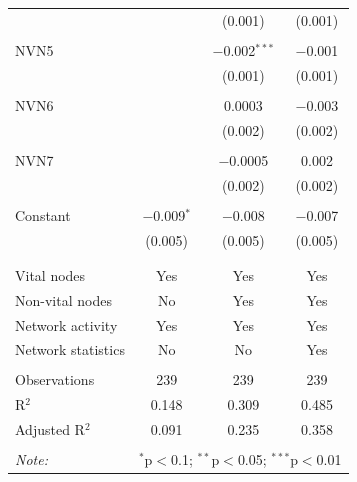 \begin{table}[!htbp]
\begin{tabular}{@{\extracolsep{5pt}}lccc}
  &  & (0.001) & (0.001) \\ 
  & & & \\ 
 NVN5 &  & $-$0.002$^{***}$ & $-$0.001 \\ 
  &  & (0.001) & (0.001) \\ 
  & & & \\ 
 NVN6 &  & 0.0003 & $-$0.003 \\ 
  &  & (0.002) & (0.002) \\ 
  & & & \\ 
 NVN7 &  & $-$0.0005 & 0.002 \\ 
  &  & (0.002) & (0.002) \\ 
  & & & \\ 
 Constant & $-$0.009$^{*}$ & $-$0.008 & $-$0.007 \\ 
  & (0.005) & (0.005) & (0.005) \\ 
  & & & \\ 
\hline \\[-1.8ex] 
Vital nodes & Yes & Yes & Yes \\ 
Non-vital nodes & No & Yes & Yes \\ 
Network activity & Yes & Yes & Yes \\ 
Network statistics & No & No & Yes \\ 
\hline &  &  &  \\ 
Observations & 239 & 239 & 239 \\ 
R$^{2}$ & 0.148 & 0.309 & 0.485 \\ 
Adjusted R$^{2}$ & 0.091 & 0.235 & 0.358 \\ 
\hline 
\hline \\[-1.8ex] 
\textit{Note:}  & \multicolumn{3}{r}{$^{*}$p$<$0.1; $^{**}$p$<$0.05; $^{***}$p$<$0.01} \\ 
\end{tabular} 
\end{table} 
